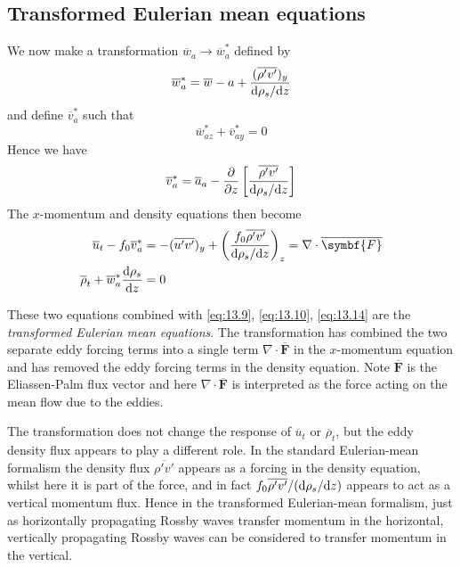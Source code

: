 \documentclass{jknotes}
\begin{document}
\subsection{Transformed Eulerian mean equations}
We now make a transformation $\overline{w}_a \to \overline{w}_a^*$ defined by
\begin{equation}
	\overline{w}_a^* = \overline{w}-a + \frac{(\overline{\rho' v'})_y}{\diffd
	\rho_s / \diffd z}
\end{equation}
and define $\overline{v}_a^*$ such that 
\begin{equation}
	\overline{w}_{az}^* + \overline{v}_{ay}^* = 0 \label{eq:13.14}
\end{equation}
Hence we have
\begin{equation}
	\overline{v}_a^* = \overline{a}_a - \frac{\partial}{\partial z} \left[
	\frac{\overline{\rho' v'}}{\diffd \rho_s/\diffd z}\right]
\end{equation}
The $x$-momentum and density equations then become
\begin{align}
	\overline{u}_t - f_0 \overline{v}_a^* &= -(\overline{u'v'})_y + \left(
	\frac{f_0 \overline{\rho'v'}}{\diffd \rho_s/\diffd z}\right)_z = \nabla
	\cdot \overline{\symbf{F}} \\
	\overline{\rho}_t + \overline{w}_a^* \frac{\diffd \rho_s}{\diffd z} &= 0
\end{align}

These two equations combined with \eqref{eq:13.9}, \eqref{eq:13.10},
\eqref{eq:13.14} are the \emph{transformed Eulerian mean equations}. The
transformation has combined the two separate eddy forcing terms into a single
term $\nabla \cdot \overline{\symbf{F}}$ in the $x$-momentum equation and has
removed the eddy forcing terms in the density equation. Note
$\overline{\symbf{F}}$ is the Eliassen-Palm flux vector and here $\nabla \cdot
\overline{\symbf{F}}$ is interpreted as the force acting on the mean flow due
to the eddies. 

The transformation does not change the response of $\overline{u}_t$ or
$\overline{\rho}_t$, but the eddy density flux appears to play a different
role. In the standard Eulerian-mean formalism the density flux
$\overline{\rho'v'}$ appears as a forcing in the density equation, whilst here
it is part of the force, and in fact $f_0 \overline{\rho'v'}/(\diffd
\rho_s/\diffd z)$ appears to act as a vertical momentum flux. Hence in the
transformed Eulerian-mean formalism, just as horizontally propagating Rossby
waves transfer momentum in the horizontal, vertically propagating Rossby waves
can be considered to transfer momentum in the vertical.
\end{document}
